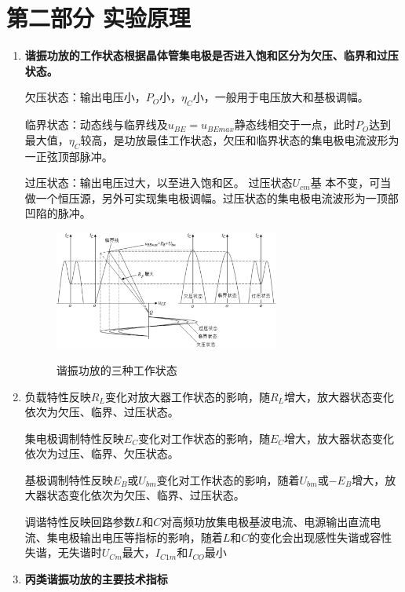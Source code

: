 \documentclass[UTF8]{ctexart}
\begin{document}
\section{第二部分 \texorpdfstring{\quad}{} 实验原理}
\begin{enumerate}
    \item \textbf{谐振功放的工作状态根据晶体管集电极是否进入饱和区分为欠压、临界和过压状态。}

    欠压状态：输出电压小，$P_O$小，$\eta_C$小，一般用于电压放大和基极调幅。

    临界状态：动态线与临界线及$u_{BE}=u_{BEmax}$静态线相交于一点，此时$P_O$达到最大值，$\eta_C$较高，是功放最佳工作状态，欠压和临界状态的集电极电流波形为一正弦顶部脉冲。

    过压状态：输出电压过大，以至进入饱和区。 过压状态$U_{cm}$基
    本不变，可当做一个恒压源，另外可实现集电极调幅。过压状态的集电极电流波形为一顶部凹陷的脉冲。

    \begin{figure}[H]
        \centering
        \includegraphics[width=0.7\textwidth]{pics/3state.png}
        ~\\
        \caption{谐振功放的三种工作状态}\label{fig:2.1}
    \end{figure}

    \item 负载特性反映$R_L$变化对放大器工作状态的影响，随$R_L$增大，放大器状态变化依次为欠压、临界、过压状态。

    集电极调制特性反映$E_C$变化对工作状态的影响，随$E_C$增大，放大器状态变化依次为过压、临界、欠压状态。

    基极调制特性反映$E_B$或$U_{bm}$变化对工作状态的影响，随着$U_{bm}$或$-E_B$增大，放大器状态变化依次为欠压、临界、过压状态。

    调谐特性反映回路参数$L$和$C$对高频功放集电极基波电流、电源输出直流电流、集电极输出电压等指标的影响，随着$L$和$C$的变化会出现感性失谐或容性失谐，无失谐时$U_{Cm}$最大，$I_{C1m}$和$I_{CO}$最小

    \item \textbf{丙类谐振功放的主要技术指标}


\end{enumerate}
\end{document}
